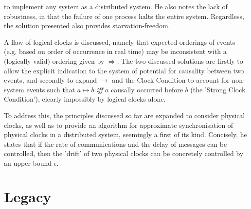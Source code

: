 \documentclass[11pt]{article}
\begin{document}
to implement any system as a distributed system. He also notes the lack of
robustness, in that the failure of one process halts the entire system.
Regardless, the solution presented also provides starvation-freedom.
\par
A flaw of logical clocks is discussed, namely that expected orderings of events
(e.g. based on order of occurrence in real time) may be inconsistent with a
(logically valid) ordering given by \( \Rightarrow \). The two discussed
solutions are firstly to allow the explicit indication to the system of potential for
causality between two events, and secondly to expand \( \rightarrow \) and the
Clock Condition to account for non-system events such that \( a \mapsto b \)
\textit{iff} \( a \) causally occurred before \( b \) (the 'Strong Clock
Condition'), clearly impossibly by logical clocks alone.
\par
To address this, the principles discussed so far are expanded to consider
physical clocks, as well as to provide an algorithm for approximate
synchronisation of physical clocks in a distributed system, seemingly a first of
its kind. Concisely, he states that if the rate of communications and the delay
of messages can be controlled, then the 'drift' of two physical clocks can be
concretely controlled by an upper bound \(\epsilon\).


\section{Legacy}
\end{document}

